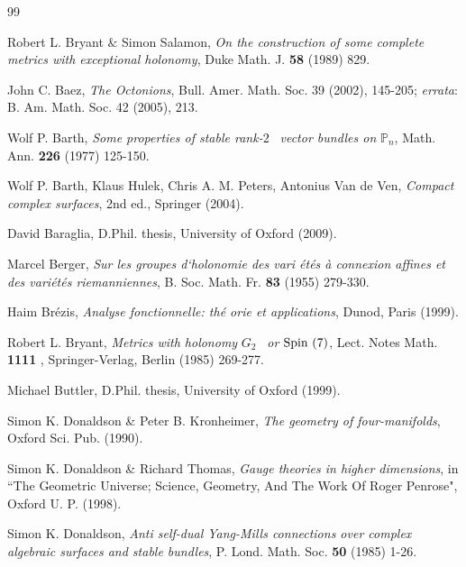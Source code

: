 \documentclass{article}
\newcommand{\func}[1]{\textnormal {#1\,}}
\begin{document}
\newpage



\begin{thebibliography}{99}


 Robert L. Bryant $\&$ Simon Salamon, \emph{On
the construction of some complete metrics with exceptional holonomy}, Duke
Math. J. \textbf{58} (1989) 829.

 John C. Baez, \emph{The Octonions}, Bull. Amer. Math. Soc. 39 (2002), 145-205; \emph{errata}: B. Am. Math. Soc. 42 (2005), 213.

 Wolf P. Barth, \emph{Some properties of stable rank-}$2$%
\emph{\ vector bundles on }$\mathbb{P}_{n}$, Math. Ann. \textbf{226} (1977)
125-150.

 Wolf P. Barth, Klaus Hulek, Chris A. M. Peters, Antonius Van de Ven, \emph{Compact complex surfaces}, 2nd ed., Springer (2004). 

 David Baraglia, D.Phil. thesis, University of Oxford (2009).

 Marcel Berger, \emph{Sur les groupes d`holonomie des vari%
\'{e}t\'{e}s \`{a} connexion affines et des vari\'{e}t\'{e}s riemanniennes},
B. Soc. Math. Fr. \textbf{83} (1955) 279-330.

 Haim Br\'{e}zis, \emph{Analyse fonctionnelle: th\'{e}%
orie et applications}, Dunod, Paris (1999).

 Robert L. Bryant, \emph{Metrics with holonomy }$G_{2}$%
\emph{\ or }$\func{Spin}\left( 7\right) $, Lect. Notes Math. \textbf{1111%
}, Springer-Verlag, Berlin (1985) 269-277.

 Michael Buttler, D.Phil. thesis, University of Oxford
(1999).

 Simon K. Donaldson \& Peter B. Kronheimer, \emph{%
The geometry of four-manifolds}, Oxford Sci. Pub. (1990).

 Simon K. Donaldson \& Richard Thomas, \emph{%
Gauge theories in higher dimensions}, in ``The Geometric Universe; Science,
Geometry, And The Work Of Roger Penrose", Oxford U. P. (1998).


 Simon K. Donaldson, \emph{Anti self-dual
Yang-Mills connections over complex algebraic surfaces and stable bundles},
P. Lond. Math. Soc. \textbf{50 }(1985) 1-26.


\end{thebibliography}
\end{document}
